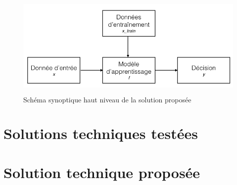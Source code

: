 \begin{figure}[h]
	\centering\includegraphics[height=5cm]{images/ML_high_level.jpeg}
	\caption{Schéma synoptique haut niveau de la solution proposée}
	\label{fig:Schéma synoptique haut niveau de la solution proposée}
\end{figure}

\section{Solutions techniques testées}
\label{Automatisation du processus d'investigation: Solutions techniques testées}




\section{Solution technique proposée}
\label{Automatisation du processus d'investigation: Solution technique proposée}


